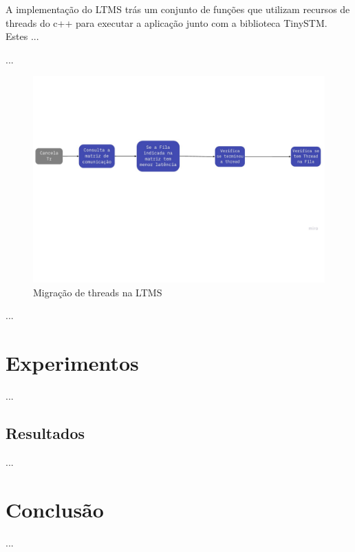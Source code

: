 \documentclass[diss,capa]{texufpel}
\begin{document}
A implementação do LTMS trás um conjunto de funções que utilizam recursos de threads do c++ para executar a aplicação junto com a biblioteca TinySTM. Estes ...


...

\begin{figure}[htbp]
  \centering \includegraphics[scale=.5]{images/lstm2}
\caption{Migração de threads na LTMS} 
\label{LTMS2}
\end{figure}

...

\chapter{Experimentos}
\label{chapter::experimentos}

...

\section{Resultados}

...

\chapter{Conclusão}
\label{chapter::Conclusão}

...


 




\end{document}
